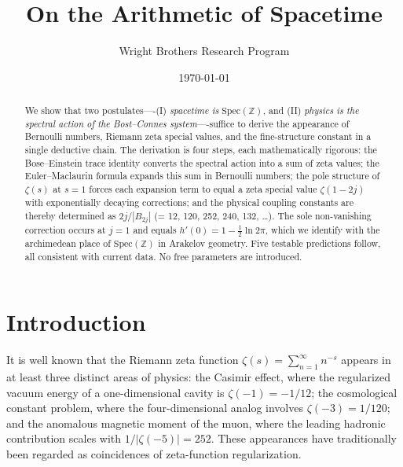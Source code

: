 \documentclass[aps,prl,twocolumn,superscriptaddress,nofootinbib]{revtex4-2}
\newcommand{\Spec}{\mathrm{Spec}}
\begin{document}
\title{On the Arithmetic of Spacetime}

\author{Wright Brothers Research Program}

\date{\today}

\begin{abstract}
We show that two postulates----(I) \emph{spacetime is}
$\Spec(\mathbb{Z})$, and (II) \emph{physics is the spectral action
of the Bost--Connes system}----suffice to derive the appearance of
Bernoulli numbers, Riemann zeta special values, and the fine-structure
constant in a single deductive chain.  The derivation is four steps,
each mathematically rigorous: the Bose--Einstein trace identity
converts the spectral action into a sum of zeta values; the
Euler--Maclaurin formula expands this sum in Bernoulli numbers;
the pole structure of $\zeta(s)$ at $s=1$ forces each expansion
term to equal a zeta special value $\zeta(1{-}2j)$ with
exponentially decaying corrections; and the physical coupling
constants are thereby determined as $2j/|B_{2j}|$ (= 12, 120, 252,
240, 132, \ldots).  The sole non-vanishing correction occurs at
$j{=}1$ and equals $h'(0)=1-\tfrac{1}{2}\ln 2\pi$, which we
identify with the archimedean place of $\Spec(\mathbb{Z})$ in
Arakelov geometry.  Five testable predictions follow, all consistent
with current data.  No free parameters are introduced.
\end{abstract}

\maketitle

\section{Introduction}

It is well known that the Riemann zeta function
$\zeta(s)=\sum_{n=1}^{\infty}n^{-s}$ appears in at least three
distinct areas of physics: the Casimir effect, where the regularized
vacuum energy of a one-dimensional cavity is $\zeta(-1)=-1/12$; the
cosmological constant problem, where the four-dimensional analog
involves $\zeta(-3)=1/120$; and the anomalous magnetic moment of the
muon, where the leading hadronic contribution scales with
$1/|\zeta(-5)|=252$.  These appearances have traditionally been
regarded as coincidences of zeta-function regularization.
\end{document}
